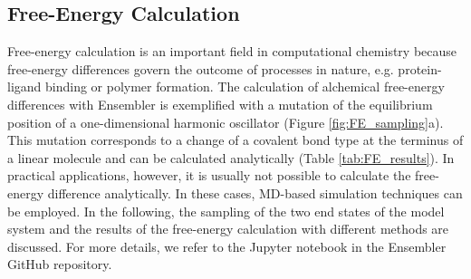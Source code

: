 \subsection{Free-Energy Calculation}

Free-energy calculation is an important field in computational chemistry because free-energy differences govern the outcome of processes in nature, e.g. protein-ligand binding or polymer formation.\cite{Christ2009, Hansen2014, Cournia2020, Armacost2020} 
%
The calculation of alchemical free-energy differences with Ensembler is exemplified with a mutation of the equilibrium position of a one-dimensional harmonic oscillator (Figure \ref{fig:FE_sampling}a).
This mutation corresponds to a change of a covalent bond type at the terminus of a linear molecule and can be calculated analytically (Table \ref{tab:FE_results}).
In practical applications, however, it is usually not possible to calculate the free-energy difference analytically. In these cases, MD-based simulation techniques can be employed.
In the following, the sampling of the two end states of the model system and the results of the free-energy calculation with different methods are discussed. For more details, we refer to the Jupyter notebook in the Ensembler GitHub repository.

